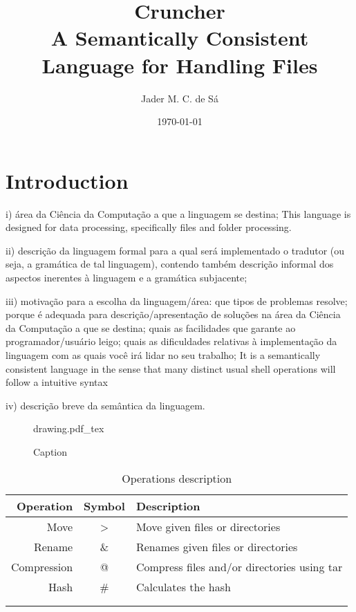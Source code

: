 \documentclass{article}
\title{Cruncher\\
\large A Semantically Consistent Language for Handling Files}
\author{Jader M. C. de Sá}
\date{\today}
\newcommand{\incfig}[1]{%
    \def\svgwidth{\columnwidth}
    {#1.pdf_tex}
}
\begin{document}
\maketitle

\section{Introduction}

i) área da Ciência da Computação a que a linguagem se destina;
This language is designed for data processing, specifically files and folder processing.



ii) descrição da linguagem formal para a qual será implementado o tradutor (ou seja, a gramática de tal linguagem), contendo também descrição informal dos aspectos inerentes à linguagem e a gramática subjacente;



iii) motivação para a escolha da linguagem/área: que tipos de problemas resolve; porque é adequada para descrição/apresentação de soluções na área da Ciência da Computação a que se destina; quais as facilidades que garante ao programador/usuário leigo; quais as dificuldades relativas à implementação da linguagem com as quais você irá lidar no seu trabalho;
It is a semantically consistent language in the sense that many distinct usual shell
operations will follow a intuitive syntax


iv) descrição breve da semântica da linguagem.

\begin{figure}
    \centering
    \incfig{drawing}
    \caption{Caption}
    \label{fig:my_label}
\end{figure}

\begin{table}[]
\centering
\caption{Operations description}
\label{tab:onmetrics}
\begin{tabular}{|r|c|l|}
\hline
Operation   & Symbol & Description\\ \hline
Move        & >      & Move given files or directories \\
Rename      & \&     & Renames given files or directories \\
Compression & @      & Compress files and/or directories using tar \\
Hash        & \#     & Calculates the hash \\
 &  &  \\
 &  &  \\
\hline
\end{tabular}
\end{table}
\end{document}
